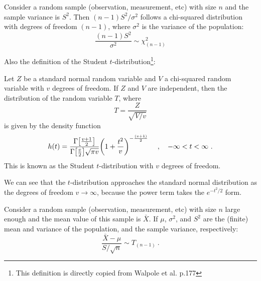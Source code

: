 \begin{thm} \label{thm: s and sigma}
  Consider a random sample (observation, measurement, etc) with size $ n $ and the sample variance is $ S^2 $. Then $ (n - 1) S^2 / \sigma^2 $ follows a chi-squared distribution with degrees of freedom $ (n - 1) $, where $ \sigma^2 $ is the variance of the population:
  \begin{equation}
    \frac{(n - 1) S^2}{\sigma^2 } \sim \chi^2_{(n-1)}
  \end{equation}
\end{thm}

Also the definition of the Student $ t $-distribution\footnote{This definition is directly copied from Walpole et al. p.177}:

\begin{defn}\label{def: t-distn}
  Let $ Z $ be a standard normal random variable and $ V $ a chi-squared random variable with $ v $ degrees of freedom. If $ Z $ and $ V $ are independent, then the distribution of the random variable $ T $, where
  \begin{equation}
    T = \frac{Z}{\sqrt{V /v}}
  \end{equation}
  is given by the density function
  \begin{equation}
    h(t) = \frac{\Gamma \qty[ \frac{v+1}{2} ]}{\Gamma \qty[\frac{v}{2}] \sqrt{\pi v}}
      \qty( 1 + \frac{t^2}{v} )^{-\frac{(v+1)}{2}}
    \quad ~, \quad
    -\infty < t < \infty ~.
  \end{equation}
  This is known as the Student $ t $-distribution with $ v $ degrees of freedom.
\end{defn}

We can see that the $ t $-distribution approaches the standard normal distribution as the degrees of freedom $ v \rightarrow \infty $, because the power term takes the $ e^{-t^2 / 2} $ form. 


\begin{thm} \label{thm: practical clt}
  Consider a random sample (observation, measurement, etc) with size $ n $ large enough and the mean value of this sample is $ \bar{X} $. If $ \mu $, $ \sigma^2 $, and $ S^2 $ are the (finite) mean and variance of the population, and the sample variance, respectively:
  \begin{equation}
    \frac{\bar{X} - \mu}{S / \sqrt{{n}}} \sim T_{(n - 1)} ~.
  \end{equation}
\end{thm}

